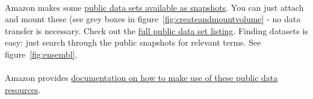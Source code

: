 \paragraph{}Amazon makes some \href{http://aws.amazon.com/publicdatasets/}{public data sets available as snapshots}. You can just attach and mount these (see grey boxes in figure~\ref{fig:createandmountvolume} - no data transfer is necessary. Check out the \href{http://developer.amazonwebservices.com/connect/kbcategory.jspa?categoryID=243}{full public data set listing}. Finding datasets is easy: just search through the public snapshots for relevant terms. See figure~\ref{fig:ensembl}.

\paragraph{}Amazon provides \href{http://docs.amazonwebservices.com/AWSEC2/latest/UserGuide/using-public-data-sets.html}{documentation on how to make use of these public data resources}.


\paragraph{}




